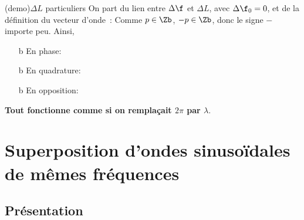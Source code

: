 \documentclass[../../main/main.tex]{subfiles}
\begin{document}
\begin{tcb*}(demo){$\Delta{L}$ particuliers}
	On part du lien entre $\Delta{\f}$ et $\Delta{L}$, avec $\Delta{\f_0} =
		0$, et de la définition du vecteur d'onde~:
	Comme $p \in \Zb$, $-p \in \Zb$, donc le signe $-$ importe peu. Ainsi,
	\begin{itemize}
		\item[b]{En phase}:
		      \vspace{-15pt}
		      \vspace{-25pt}
		\item[b]{En quadrature}:
		      \vspace{-15pt}
		      \vspace{-25pt}
		\item[b]{En opposition}:
		      \vspace{-15pt}
		      \vspace{-25pt}
	\end{itemize}
	\textbf{Tout fonctionne comme si on remplaçait $2\pi$ par $\lambda$}.
\end{tcb*}

\section{Superposition d'ondes sinusoïdales de mêmes fréquences}
\subsection{Présentation}
\end{document}
